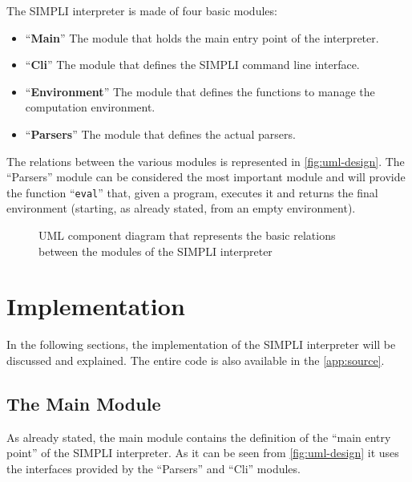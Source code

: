 \documentclass{esposito-documentation}
\begin{document}
The SIMPLI interpreter is made of four basic modules:
\begin{itemize}
	\item ``\textbf{Main}'' The module that holds the main entry point of the
		interpreter.
	\item ``\textbf{Cli}'' The module that defines the SIMPLI command line
		interface.
	\item ``\textbf{Environment}'' The module that defines the functions to
		manage the computation environment.
	\item ``\textbf{Parsers}'' The module that defines the actual parsers.
\end{itemize}
The relations between the various modules is represented in
\autoref{fig:uml-design}. The ``Parsers'' module can be considered the most
important module and will provide the function ``\texttt{eval}'' that, given a
program, executes it and returns the final environment (starting, as already
stated, from an empty environment).

\begin{figure}[H]
	\centering
	\caption{UML component diagram that represents the basic relations between the modules of the SIMPLI interpreter}
	\label{fig:uml-design}
\end{figure}

\chapter{Implementation}

In the following sections, the implementation of the SIMPLI interpreter will be
discussed and explained. The entire code is also available in the
\autoref{app:source}.
\section{The Main Module}



As already stated, the main module contains the definition of the ``main entry
point'' of the SIMPLI interpreter. As it can be seen from
\autoref{fig:uml-design} it uses the interfaces provided by the ``Parsers'' and
``Cli'' modules.
\end{document}
